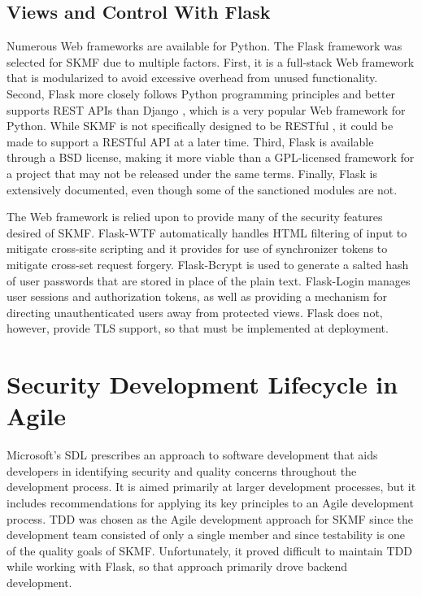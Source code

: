\subsection{Views and Control With Flask}
\label{method:flask}

Numerous Web frameworks are available for Python. The Flask framework
\cite{flask}
was selected for SKMF due to multiple factors. First, it is a full-stack Web framework that is modularized to avoid excessive overhead from unused functionality. Second, Flask more closely follows Python programming principles and better supports REST APIs than Django
\cite{django},
which is a very popular Web framework for Python. While SKMF is not specifically designed to be RESTful
\cite{restful},
it could be made to support a RESTful API at a later time. Third, Flask is available through a BSD license, making it more viable than a GPL-licensed framework for a project that may not be released under the same terms. Finally, Flask is extensively documented, even though some of the sanctioned modules are not.

The Web framework is relied upon to provide many of the security features desired of SKMF. Flask-WTF
\cite{flask-wtf}
automatically handles HTML filtering of input to mitigate cross-site scripting and it provides for use of synchronizer tokens to mitigate cross-set request forgery. Flask-Bcrypt
\cite{flask-bcrypt}
is used to generate a salted hash of user passwords that are stored in place of the plain text. Flask-Login
\cite{flask-login}
manages user sessions and authorization tokens, as well as providing a mechanism for directing unauthenticated users away from protected views. Flask does not, however, provide TLS support, so that must be implemented at deployment.


\section{Security Development Lifecycle in Agile}
\label{method:sdl}

Microsoft's SDL
\cite{secdevlifecycle}
prescribes an approach to software development that aids developers in identifying security and quality concerns throughout the development process. It is aimed primarily at larger development processes, but it includes recommendations for applying its key principles to an Agile development process. TDD was chosen as the Agile development approach for SKMF since the development team consisted of only a single member and since testability is one of the quality goals of SKMF. Unfortunately, it proved difficult to maintain TDD while working with Flask, so that approach primarily drove backend development.


